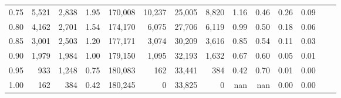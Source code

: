 \begin{tabular}{rrrrrrrrrrrrrr}
0.75 &   5,521 &  2,838 &    1.95 &  170,008 &   10,237 &  25,005 &   8,820 &  1.16 &  0.46 &  0.26 &      0.09 \\
0.80 &   4,162 &  2,701 &    1.54 &  174,170 &    6,075 &  27,706 &   6,119 &  0.99 &  0.50 &  0.18 &      0.06 \\
0.85 &   3,001 &  2,503 &    1.20 &  177,171 &    3,074 &  30,209 &   3,616 &  0.85 &  0.54 &  0.11 &      0.03 \\
0.90 &   1,979 &  1,984 &    1.00 &  179,150 &    1,095 &  32,193 &   1,632 &  0.67 &  0.60 &  0.05 &      0.01 \\
0.95 &     933 &  1,248 &    0.75 &  180,083 &      162 &  33,441 &     384 &  0.42 &  0.70 &  0.01 &      0.00 \\
1.00 &     162 &    384 &    0.42 &  180,245 &        0 &  33,825 &       0 &   nan &   nan &  0.00 &      0.00 \\
\bottomrule
\end{tabular}
